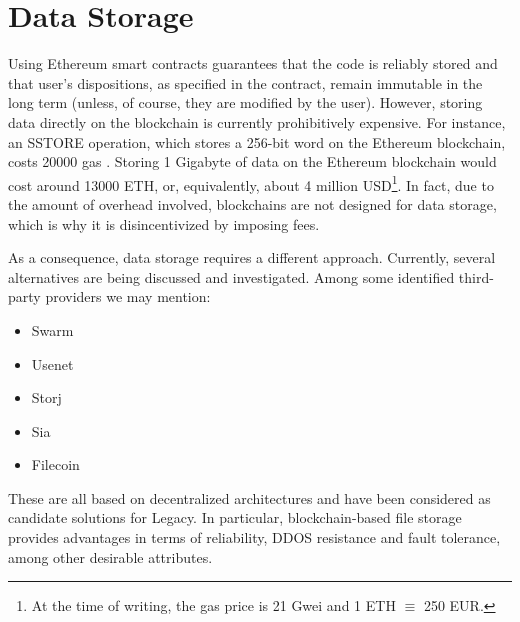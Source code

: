 

\section{Data Storage} %
\label{sec:data_storage}
Using Ethereum smart contracts guarantees that the code is reliably stored and that user's dispositions, as specified in the contract, remain immutable in the long term (unless, of course, they are modified by the user). However, storing data directly on the blockchain is currently prohibitively expensive.
For instance, an SSTORE operation, which stores a 256-bit word on the Ethereum blockchain, costs 20000 gas \cite[Appendix G]{Wood}. Storing 1 Gigabyte of data on the Ethereum blockchain would cost around 13000 ETH, or, equivalently, about 4 million USD\footnote{At the time of writing, the gas price is 21 Gwei and 1 ETH $\equiv$ 250 EUR.}.
In fact, due to the amount of overhead involved, blockchains are not designed for data storage, which is why it is disincentivized by imposing fees. 

As a consequence, data storage requires a different approach. Currently, several alternatives are being discussed and investigated.
Among some identified third-party providers we may mention:

\begin{itemize}
	\item Swarm
	\item Usenet
	\item Storj
	\item Sia
	\item Filecoin
\end{itemize}

These are all based on decentralized architectures and have been considered as candidate solutions for Legacy.
In particular, blockchain-based file storage provides advantages in terms of reliability, DDOS resistance and fault tolerance, among other desirable attributes. 

